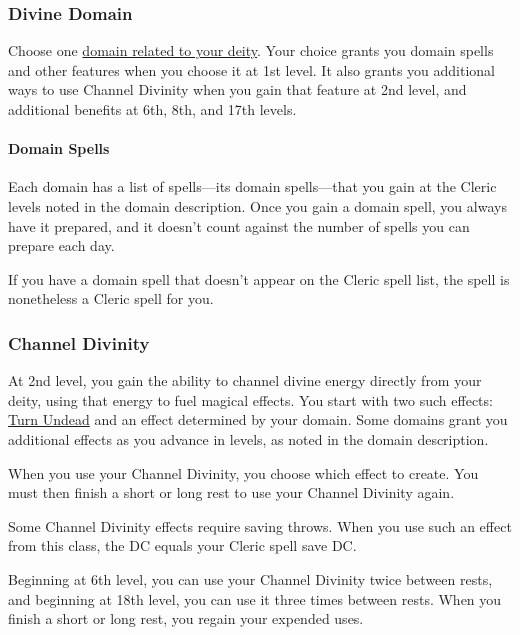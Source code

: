 \subsubsection{Divine Domain}\label{Cleric_divine-domain}

Choose one \hyperref[Cleric_domains]{domain related to your deity}. Your
choice grants you domain spells and other features when you choose it at
1st level. It also grants you additional ways to use Channel Divinity
when you gain that feature at 2nd level, and additional benefits at 6th,
8th, and 17th levels.

\paragraph{Domain Spells}\label{Cleric_domain-spells}

Each domain has a list of spells---\hspace{0pt}its domain
spells---\hspace{0pt}that you gain at the Cleric levels noted in the
domain description. Once you gain a domain spell, you always have it
prepared, and it doesn't count against the number of spells you can
prepare each day.

If you have a domain spell that doesn't appear on the Cleric spell list,
the spell is nonetheless a Cleric spell for you.

\subsubsection{Channel Divinity}\label{Cleric_channel-divinity}

At 2nd level, you gain the ability to channel divine energy directly
from your deity, using that energy to fuel magical effects. You start
with two such effects:
\hyperref[Cleric_channel-divinity-turn-undead]{Turn Undead} and an
effect determined by your domain. Some domains grant you additional
effects as you advance in levels, as noted in the domain description.

When you use your Channel Divinity, you choose which effect to create.
You must then finish a short or long rest to use your Channel Divinity
again.

Some Channel Divinity effects require saving throws. When you use such
an effect from this class, the DC equals your Cleric spell save DC.

Beginning at 6th level, you can use your Channel Divinity twice between
rests, and beginning at 18th level, you can use it three times between
rests. When you finish a short or long rest, you regain your expended
uses.

